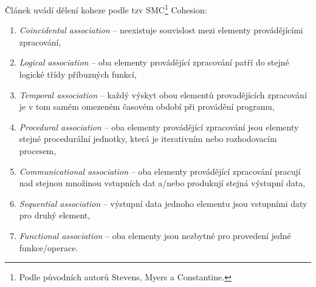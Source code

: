 Článek \cite{ISI:000079726000029} uvádí dělení koheze podle tzv SMC\footnote{Podle původních autorů Stevens, Myers a Constantine.} Cohesion:
\begin{enumerate}
\item \emph{Coincidental association} -- neexistuje souvislost mezi elementy provádějícími zpracování,
\item \emph{Logical association} -- oba elementy provádějící zpracování patří do stejné logické třídy příbuzných funkcí,
\item \emph{Temporal association} -- každý výskyt obou elementů provadějících zpracování je v tom samém omezeném časovém období při provádění programu,
\item \emph{Procedural association} -- oba elementy provádějící zpracování jsou elementy stejné procedurální jednotky, která je iterativním nebo rozhodovacím procesem,
\item \emph{Communicational association} -- oba elementy provádějící zpracování pracují nad stejnou množinou vstupních dat a/nebo produkují stejná výstupní data,
\item \emph{Sequential association} -- výstupní data jednoho elementu jsou vstupními daty pro druhý element,
\item \emph{Functional association} -- oba elementy jsou nezbytné pro provedení jedné funkce/operace.
\end{enumerate}

